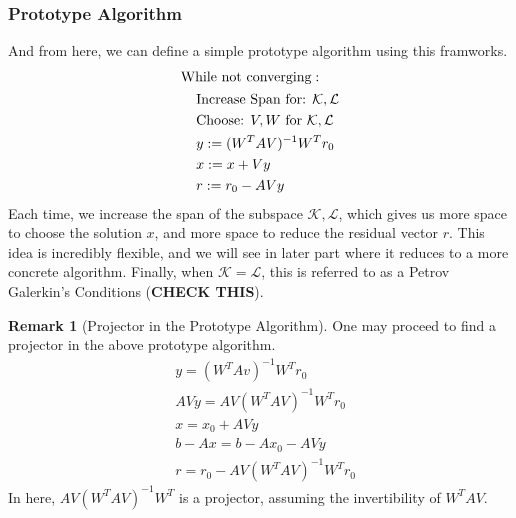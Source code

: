 \documentclass[]{article}
\theoremstyle{definition}
\newtheorem{remark}{Remark}[subsection]
\begin{document}
        \subsubsection{Prototype Algorithm}
            And from here, we can define a simple prototype algorithm using this framworks. 
            \begin{align}
                \begin{aligned}
                    & \text{While not converging}: 
                    \\&\hspace{1.1em}
                            \begin{aligned}
                            &\text{Increase Span for: } \mathcal{K, L}
                            \\
                            &\text{Choose: } V, W \text{ for } \mathcal{K}, \mathcal{L}
                            \\
                            & y:= (W^TAV)^{-1}W^Tr_0
                            \\
                            & x:= x+ Vy
                            \\
                            & r:= r_0 - AVy
                        \end{aligned}
                \end{aligned}
            \end{align}
            Each time, we increase the span of the subspace $\mathcal K, \mathcal L$, which gives us more space to choose the solution $x$, and more space to reduce the residual vector $r$. This idea is incredibly flexible, and we will see in later part where it reduces to a more concrete algorithm. Finally, when $\mathcal K = \mathcal L$, this is referred to as a Petrov Galerkin's Conditions (\textbf{CHECK THIS}). 
            \\
            \begin{remark}[Projector in the Prototype Algorithm]
                One may proceed to find a projector in the above prototype algorithm. 
                \begin{align}
                    & y = (W^TAv)^{-1}W^Tr_0
                    \\
                    & AVy = AV(W^TAV)^{-1}W^{T}r_0
                    \\
                    & x = x_0 + AVy
                    \\
                    & b - Ax = b - Ax_0 - AVy
                    \\
                    & r = r_0 - AV(W^TAV)^{-1}W^Tr_0
                \end{align}
                In here, $AV(W^TAV)^{-1}W^T$ is a projector, assuming the invertibility of $W^TAV$. 
            \end{remark}
        
\end{document}

